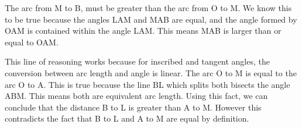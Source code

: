 \documentclass{report}
\begin{document}
\begin{description}
\begin{mdframed}
\begin{mdframed}
\begin{center}
{

                    }
                \end{center}
                The arc from M to B, must be greater than the arc
                from O to M. We know this to be true because the
                angles LAM and MAB are equal, and the angle
                formed by OAM is contained within the angle
                LAM. This means MAB is larger than or equal to
                OAM.

                This line of reasoning works because for inscribed
                and tangent angles, the conversion between arc length
                and angle is linear. 
                The arc O to M is equal to the arc O to A. This is
                true because the line BL which splits both bisects
                the angle ABM. This means both are equivalent arc
                length.
                Using this fact, we can conclude that the
                distance B to L is greater than A to M.
                However this contradicts the fact that
                B to L and A to M are equal by definition.


\end{mdframed}
\end{mdframed}
\end{description}
\end{document}
